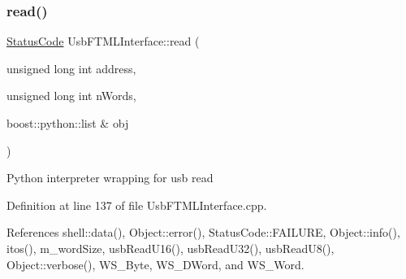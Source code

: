 \subsubsection{\texorpdfstring{read()}{read()}\hspace{0.1cm}{\footnotesize\ttfamily [2/2]}}
{\footnotesize\ttfamily \hyperlink{classStatusCode}{Status\+Code} Usb\+F\+T\+M\+L\+Interface\+::read (\begin{DoxyParamCaption}\item[{unsigned long int}]{address,  }\item[{unsigned long int}]{n\+Words,  }\item[{boost\+::python\+::list \&}]{obj }\end{DoxyParamCaption})}

Python interpreter wrapping for usb read 

Definition at line 137 of file Usb\+F\+T\+M\+L\+Interface.\+cpp.



References shell\+::data(), Object\+::error(), Status\+Code\+::\+F\+A\+I\+L\+U\+RE, Object\+::info(), itos(), m\+\_\+word\+Size, usb\+Read\+U16(), usb\+Read\+U32(), usb\+Read\+U8(), Object\+::verbose(), W\+S\+\_\+\+Byte, W\+S\+\_\+\+D\+Word, and W\+S\+\_\+\+Word.


